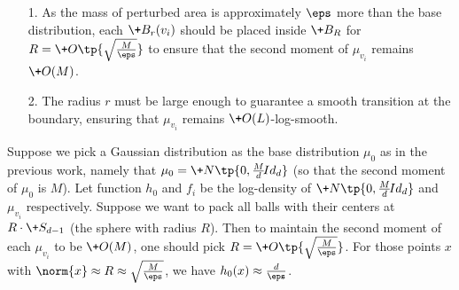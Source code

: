 \documentclass[11pt,a4paper]{article}
\begin{document}
\begin{itemize}
    \item [1.] As the mass of perturbed area is approximately $\eps$ more than the base distribution, each $\+B_r(v_i)$ should be placed inside $\+B_R$ for $R=\+O\tp{\sqrt{\frac{M}{\eps}}}$ to ensure that the second moment of $\mu_{v_i}$ remains $\+O(M)$.
    \item [2.] The radius $r$ must be large enough to guarantee a smooth transition at the boundary, ensuring that $\mu_{v_i}$ remains $\+O(L)$-log-smooth.
\end{itemize}
Suppose we pick a Gaussian distribution as the base distribution $\mu_0$ as in the previous work, namely that $\mu_0 = \+N\tp{0,\frac{M}{d}\!{Id}_d}$ (so that the second moment of $\mu_0$ is $M$). Let function $h_0$ and $f_i$ be the log-density of $\+N\tp{0,\frac{M}{d}\!{Id}_d}$ and $\mu_{v_i}$ respectively.  Suppose we want to pack all balls with their centers at $R\cdot\+S_{d-1}$ (the sphere with radius $R$). Then to maintain the second moment of each $\mu_{v_i}$ to be $\+O(M)$, one should pick $R = \+O\tp{\sqrt{\frac{M}{\eps}}}$. For those points $x$ with $\norm{x}\approx R\approx \sqrt{\frac{M}{\eps}}$, we have $h_0(x)\approx \frac{d}{\eps}$. 
\end{document}
